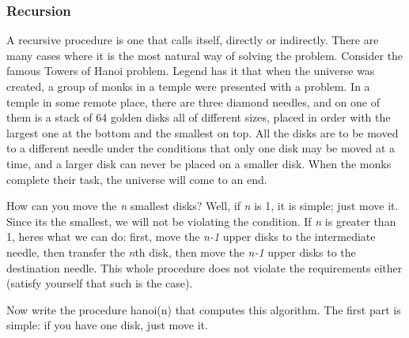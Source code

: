 
\subsubsection[Recursion]{Recursion}

A recursive procedure is one that calls itself,
directly or indirectly. There are many cases where it is the most
natural way of solving the problem. Consider the famous
{\textquotedbl}Towers of Hanoi{\textquotedbl} problem.
Legend has it that when the universe was created, a group of monks in a
temple were presented with a problem. In a temple in some remote place,
there are three diamond needles, and on one of them is a
stack of 64 golden disks all of different sizes, placed in
order with the largest one at the bottom and the smallest on top. All
the disks are to be moved to a different needle under the conditions
that only one disk may be moved at a time, and a larger disk can never
be placed on a smaller disk. When the monks complete their task, the
universe will come to an end.

How can you move the \textit{n} smallest disks? Well, if \textit{n} is
1, it is simple; just move it. Since it{\textquotesingle}s the
smallest, we will not be violating the condition. If \textit{n} is
greater than 1, here{\textquotesingle}s what we can do: first, move the
\textit{n-1} upper disks to the intermediate needle, then transfer the
\textit{n}th disk, then move the \textit{n-1} upper disks to the
destination needle. This whole procedure does not violate the
requirements either (satisfy yourself that such is the case).

Now write the procedure \textsf{hanoi(n)} that computes this algorithm.
The first part is simple: if you have one disk, just move it.


